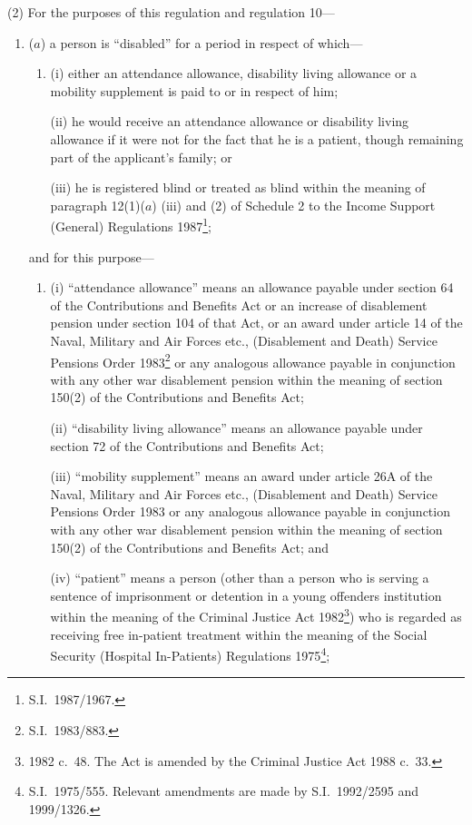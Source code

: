 \documentclass[12pt,a4paper]{article}
\begin{document}
(2) For the purposes of this regulation and regulation 10—
\begin{enumerate}\item[]
($a$) a person is “disabled” for a period in respect of which—
\begin{enumerate}\item[]
(i) either an attendance allowance, disability living allowance or a mobility supplement is paid to or in respect of him;

(ii) he would receive an attendance allowance or disability living allowance if it were not for the fact that he is a patient, though remaining part of the applicant’s family; or

(iii) he is registered blind or treated as blind within the meaning of paragraph 12(1)($a$) (iii)  and (2) of Schedule 2 to the Income Support (General) Regulations 1987\footnote{S.I.\ 1987/1967.};
\end{enumerate}
and for this purpose—
\begin{enumerate}\item[]
(i) “attendance allowance” means an allowance payable under section 64 of the Contributions and Benefits Act or an increase of disablement pension under section 104 of that Act, or an award under article 14 of the Naval, Military and Air Forces etc., (Disablement and Death) Service Pensions Order 1983\footnote{S.I.\ 1983/883.} or any analogous allowance payable in conjunction with any other war disablement pension within the meaning of section 150(2) of the Contributions and Benefits Act;

(ii) “disability living allowance” means an allowance payable under section 72 of the Contributions and Benefits Act;

(iii) “mobility supplement” means an award under article 26A of the Naval, Military and Air Forces etc., (Disablement and Death) Service Pensions Order 1983 or any analogous allowance payable in conjunction with any other war disablement pension within the meaning of section 150(2) of the Contributions and Benefits Act; and

(iv) “patient” means a person (other than a person who is serving a sentence of imprisonment or detention in a young offenders institution within the meaning of the Criminal Justice Act 1982\footnote{1982 c.\ 48. The Act is amended by the Criminal Justice Act 1988 c.\ 33.}) who is regarded as receiving free in-patient treatment within the meaning of the Social Security (Hospital In-Patients) Regulations 1975\footnote{S.I.\ 1975/555. Relevant amendments are made by S.I.\ 1992/2595 and 1999/1326.};
\end{enumerate}


\end{enumerate}
\end{document}
